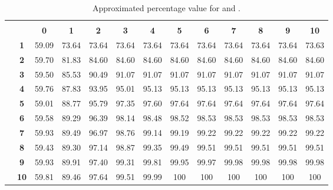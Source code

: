 \documentclass{ocg}
\begin{document}
\begin{table}[h]
  \centering\scriptsize
  \begin{tabular}{|c|c|c|c|c|c|c|c|c|c|c|c|c|}\cline{3-13}
    \multicolumn{1}{c}{}&\multicolumn{1}{c}{} & \multicolumn{11}{|c|}{\footnotesize }\\
    \cline{3-13} 
    \multicolumn{2}{c|}{}&\bf 0&\bf1&\bf2&\bf3&\bf4&\bf5&\bf6&\bf7&\bf8&\bf9&\bf10\\\hline
    \multirow{10}{*}{\footnotesize }& \bf 1
&59.09&73.64&73.64&73.64&73.64&73.64&73.64&73.64&73.64&73.64&73.63\\    \cline{2-13}
&\bf 2&59.70&81.83&84.60&84.60&84.60&84.60&84.60&84.60&84.60&84.60&84.60\\    \cline{2-13}
&\bf 3&59.50&85.53&90.49&91.07&91.07&91.07&91.07&91.07&91.07&91.07&91.07\\    \cline{2-13}
&\bf 4&59.76&87.83&93.95&95.01&95.13&95.13&95.13&95.13&95.13&95.13&95.13\\    \cline{2-13}
&\bf 5&59.01&88.77&95.79&97.35&97.60&97.64&97.64&97.64&97.64&97.64&97.64\\    \cline{2-13}
&\bf 6&59.58&89.29&96.39&98.14&98.48&98.52&98.53&98.53&98.53&98.53&98.53\\    \cline{2-13}
&\bf 7&59.93&89.49&96.97&98.76&99.14&99.19&99.22&99.22&99.22&99.22&99.22\\    \cline{2-13}
&\bf 8&59.43&89.30&97.14&98.87&99.35&99.49&99.51&99.51&99.51&99.51&99.51\\    \cline{2-13}
&\bf 9&59.93&89.91&97.40&99.31&99.81&99.95&99.97&99.98&99.98&99.98&99.98\\    \cline{2-13}
&\bf 10&59.81&89.46&97.64&99.51&99.99&100&100&100&100&100&100\\    
\hline
  \end{tabular}
  \caption{Approximated percentage value for  and .}
  \label{table45x}
\end{table}
\end{document}
